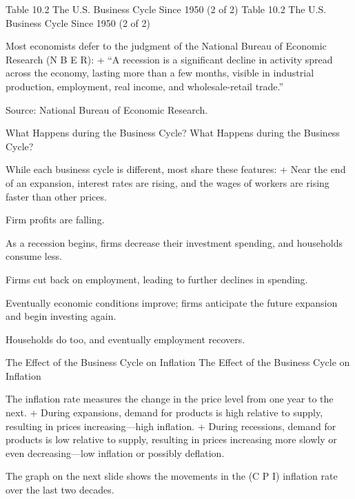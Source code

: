\documentclass[
  12pt,
  ignorenonframetext,
]{beamer}
\begin{document}
\begin{frame}{Table 10.2 The U.S. Business Cycle Since 1950 (2 of 2)}
\protect\hypertarget{table-10.2-the-u.s.-business-cycle-since-1950-2-of-2}{}
Table 10.2 The U.S. Business Cycle Since 1950 (2 of 2)

Most economists defer to the judgment of the National Bureau of Economic
Research (N B E R): + ``A recession is a significant decline in activity
spread across the economy, lasting more than a few months, visible in
industrial production, employment, real income, and wholesale-retail
trade.''

Source: National Bureau of Economic Research.
\end{frame}

\begin{frame}{What Happens during the Business Cycle?}
\protect\hypertarget{what-happens-during-the-business-cycle}{}
What Happens during the Business Cycle?

While each business cycle is different, most share these features: +
Near the end of an expansion, interest rates are rising, and the wages
of workers are rising faster than other prices.

Firm profits are falling.

As a recession begins, firms decrease their investment spending, and
households consume less.

Firms cut back on employment, leading to further declines in spending.

Eventually economic conditions improve; firms anticipate the future
expansion and begin investing again.

Households do too, and eventually employment recovers.
\end{frame}

\begin{frame}{The Effect of the Business Cycle on Inflation}
\protect\hypertarget{the-effect-of-the-business-cycle-on-inflation}{}
The Effect of the Business Cycle on Inflation

The inflation rate measures the change in the price level from one year
to the next. + During expansions, demand for products is high relative
to supply, resulting in prices increasing---high inflation. + During
recessions, demand for products is low relative to supply, resulting in
prices increasing more slowly or even decreasing---low inflation or
possibly deflation.

The graph on the next slide shows the movements in the (C P I) inflation
rate over the last two decades.
\end{frame}
\end{document}
